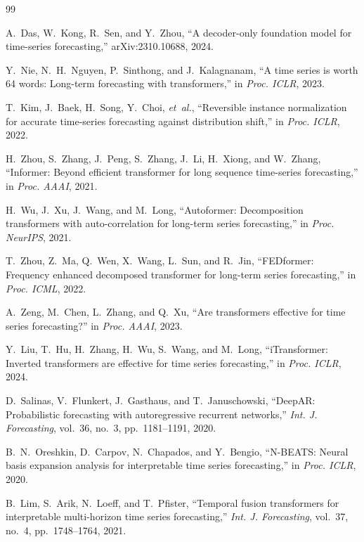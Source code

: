 \documentclass[journal]{IEEEtran}
\begin{document}
\begin{thebibliography}{99}

A.~Das, W.~Kong, R.~Sen, and Y.~Zhou,
``A decoder-only foundation model for time-series forecasting,''
arXiv:2310.10688, 2024.

Y.~Nie, N.~H.~Nguyen, P.~Sinthong, and J.~Kalagnanam,
``A time series is worth 64 words: Long-term forecasting with transformers,''
in \emph{Proc. ICLR}, 2023.

T.~Kim, J.~Baek, H.~Song, Y.~Choi, \emph{et~al.},
``Reversible instance normalization for accurate time-series forecasting against distribution shift,''
in \emph{Proc. ICLR}, 2022.

H.~Zhou, S.~Zhang, J.~Peng, S.~Zhang, J.~Li, H.~Xiong, and W.~Zhang,
``Informer: Beyond efficient transformer for long sequence time-series forecasting,''
in \emph{Proc. AAAI}, 2021.

H.~Wu, J.~Xu, J.~Wang, and M.~Long,
``Autoformer: Decomposition transformers with auto-correlation for long-term series forecasting,''
in \emph{Proc. NeurIPS}, 2021.

T.~Zhou, Z.~Ma, Q.~Wen, X.~Wang, L.~Sun, and R.~Jin,
``FEDformer: Frequency enhanced decomposed transformer for long-term series forecasting,''
in \emph{Proc. ICML}, 2022.

A.~Zeng, M.~Chen, L.~Zhang, and Q.~Xu,
``Are transformers effective for time series forecasting?''
in \emph{Proc. AAAI}, 2023.

Y.~Liu, T.~Hu, H.~Zhang, H.~Wu, S.~Wang, and M.~Long,
``iTransformer: Inverted transformers are effective for time series forecasting,''
in \emph{Proc. ICLR}, 2024.

D.~Salinas, V.~Flunkert, J.~Gasthaus, and T.~Januschowski,
``DeepAR: Probabilistic forecasting with autoregressive recurrent networks,''
\emph{Int. J. Forecasting}, vol.~36, no.~3, pp.~1181--1191, 2020.

B.~N.~Oreshkin, D.~Carpov, N.~Chapados, and Y.~Bengio,
``N-BEATS: Neural basis expansion analysis for interpretable time series forecasting,''
in \emph{Proc. ICLR}, 2020.

B.~Lim, S.~Arik, N.~Loeff, and T.~Pfister,
``Temporal fusion transformers for interpretable multi-horizon time series forecasting,''
\emph{Int. J. Forecasting}, vol.~37, no.~4, pp.~1748--1764, 2021.


\end{thebibliography}
\end{document}
